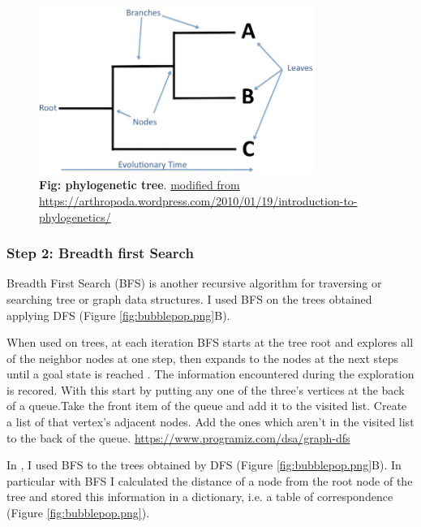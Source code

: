 \begin{figure}[H]
\centering
\includegraphics[width=0.80\textwidth]{fig/phylogenies.jpg}
\decoRule
\caption{\textbf{Fig: phylogenetic tree}. 
\url{modified from https://arthropoda.wordpress.com/2010/01/19/introduction-to-phylogenetics/}}
\label{fig:phylogenies.jpg}
\end{figure}

\subsubsection{Step 2: Breadth first Search}
Breadth First Search (BFS) \cite{beamer2012direction} is another recursive algorithm for traversing or searching tree or graph data structures. I used BFS on the trees obtained applying DFS (Figure \ref{fig:bubblepop.png}B).

When used on trees, at each iteration BFS starts at the tree root and explores all of the neighbor nodes at one step, then expands to the nodes at the next steps until a goal state is reached \cite{korf1985depth, wiki:BFS}. The information encountered during the exploration is recored. 
With this start by putting any one of the three's vertices at the back of a queue.Take the front item of the queue and add it to the visited list. Create a list of that vertex's adjacent nodes. Add the ones which aren't in the visited list to the back of the queue. \url{https://www.programiz.com/dsa/graph-dfs}

In \bbp, I used BFS to the trees obtained by DFS (Figure \ref{fig:bubblepop.png}B).
In particular with BFS I calculated the distance of a node from the root node of the tree and stored this information in a dictionary, i.e. a table of correspondence (Figure \ref{fig:bubblepop.png}). 

